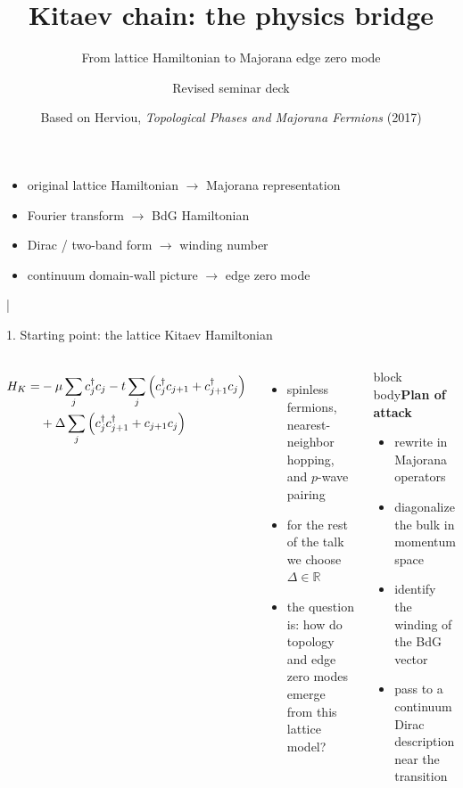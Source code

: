\documentclass[aspectratio=169,11pt]{beamer}
\title{Kitaev chain: the physics bridge}
\subtitle{From lattice Hamiltonian to Majorana edge zero mode}
\author{Revised seminar deck}
\date{Based on Herviou, \emph{Topological Phases and Majorana Fermions} (2017)}
\newcommand{\bluebox}[1]{%
\begin{beamercolorbox}[rounded=true,sep=0.7em,wd=\linewidth]{block body}#1\end{beamercolorbox}}
\begin{document}
\begin{frame}[plain]
  \vspace{0.6cm}
  {\color{TitleBlue}\inserttitle\par}
  \vspace{0.35cm}
  {\Large\color{DarkGray}\insertsubtitle\par}
  \vspace{0.85cm}
  \begin{itemize}
    \item original lattice Hamiltonian \(\to\) Majorana representation
    \item Fourier transform \(\to\) BdG Hamiltonian
    \item Dirac / two-band form \(\to\) winding number
    \item continuum domain-wall picture \(\to\) edge zero mode
  \end{itemize}
  \vfill
  {\small\color{LightGray}\insertauthor\hspace{0.8em}|\hspace{0.8em}\insertdate}
\end{frame}

\begin{frame}{1. Starting point: the lattice Kitaev Hamiltonian}
\begin{columns}[T,totalwidth=\textwidth]
\begin{align}
H_K=
&-\mu\sum_j c_j^{\dagger}c_j
-t\sum_j\left(c_j^{\dagger}c_{j+1}+c_{j+1}^{\dagger}c_j\right) \notag \\
&+\Delta\sum_j\left(c_j^{\dagger}c_{j+1}^{\dagger}+c_{j+1}c_j\right)
\end{align}

\vspace{0.05cm}
\begin{itemize}
  \item spinless fermions, nearest-neighbor hopping, and \(p\)-wave pairing
  \item for the rest of the talk we choose \(\Delta\in\mathbb R\)
  \item the question is: how do topology and edge zero modes emerge from this lattice model?
\end{itemize}

\bluebox{\textbf{Plan of attack}
\vspace{0.25em}
\begin{itemize}
  \item rewrite in Majorana operators
  \item diagonalize the bulk in momentum space
  \item identify the winding of the BdG vector
  \item pass to a continuum Dirac description near the transition
\end{itemize}}
\end{columns}
\end{frame}
\end{document}

